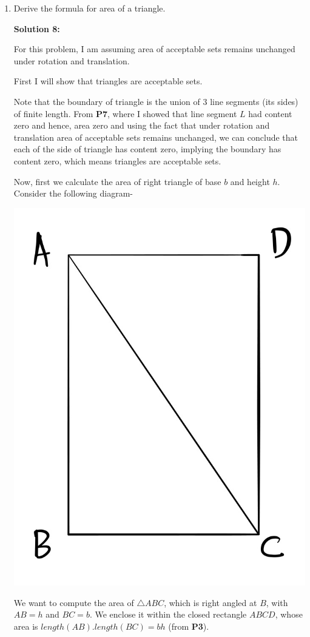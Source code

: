\documentclass[11pt]{amsart}
\theoremstyle{definition}
\begin{document}
\begin{enumerate}[wide, labelwidth=!, labelindent=0pt]
\newpage
\item Derive the formula for area of a triangle.

\textbf{Solution 8:}

For this problem, I am assuming area of acceptable sets remains unchanged under rotation and translation.

First I will show that triangles are acceptable sets.

Note that the boundary of triangle is the union of $3$ line segments (its sides) of finite length. From \textbf{P7}, where I showed that line segment $L$ had content zero and hence, area zero and using the fact that under rotation and translation area of acceptable sets remains unchanged, we can conclude that each of the side of triangle has content zero, implying the boundary has content zero, which means triangles are acceptable sets.

Now, first we calculate the area of right triangle of base $b$ and height $h$. Consider the following diagram-
\begin{center}
\includegraphics[scale = 0.12]{images/rect.jpeg}   
\end{center}
We want to compute the area of $\triangle ABC$, which is right angled at $B$, with $AB = h$ and $BC = b$. We enclose it within the closed rectangle $ABCD$, whose area is $length(AB).length(BC) = bh$ (from \textbf{P3}). 


\end{enumerate}
\end{document}
